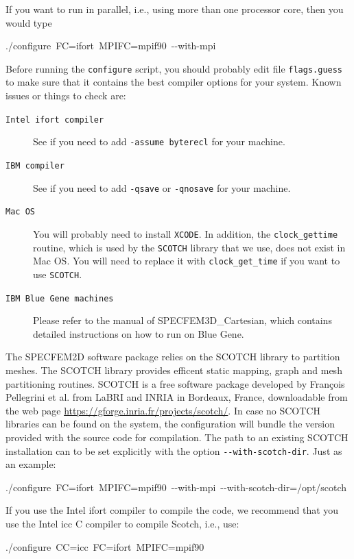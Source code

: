\documentclass[oneside,english,onecolumn,letterpaper]{book}
\newenvironment{lyxcode}
{\begin{list}{}{
\setlength{\rightmargin}{\leftmargin}
\setlength{\listparindent}{0pt}%
\raggedright
\setlength{\itemsep}{0pt}
\setlength{\parsep}{0pt}
\normalfont\ttfamily}%
 \item[]}
{\end{list}}
\begin{document}
If you want to run in parallel, i.e., using more than one processor core, then you would type
\begin{lyxcode}
./configure~FC=ifort~MPIFC=mpif90~-{}-with-mpi
\end{lyxcode}

Before running the \texttt{configure} script, you should probably edit file \texttt{flags.guess} to make sure that it contains the best compiler options for your system. Known issues or things to check are:

\begin{description}
\item [{\texttt{Intel ifort compiler}}] See if you need to add \texttt{-assume byterecl} for your machine.
\item [{\texttt{IBM compiler}}] See if you need to add \texttt{-qsave} or \texttt{-qnosave} for your machine.
\item [{\texttt{Mac OS}}] You will probably need to install \texttt{XCODE}.
In addition, the \texttt{clock\_gettime} routine, which is used by the \texttt{SCOTCH} library that we use, does not exist in Mac OS.
You will need to replace it with \texttt{clock\_get\_time} if you want to use \texttt{SCOTCH}.
\item [{\texttt{IBM Blue Gene machines}}] Please refer to the manual of SPECFEM3D\_Cartesian, which contains detailed instructions on how to run on Blue Gene.
\end{description}

The SPECFEM2D software package relies on the SCOTCH library to partition meshes.
The SCOTCH library \citep{PeRo96}
provides efficent static mapping, graph and mesh partitioning routines. SCOTCH is a free software package developed by
Fran\c {c}ois Pellegrini et al. from LaBRI and INRIA in Bordeaux, France, downloadable from the web page \url{https://gforge.inria.fr/projects/scotch/}.
In case no SCOTCH libraries can be found on the system, the configuration will bundle the version provided with the source code for compilation.
The path to an existing SCOTCH installation can to be set explicitly with the option \texttt{-{}-with-scotch-dir}.
Just as an example:
\begin{lyxcode}
./configure~FC=ifort~MPIFC=mpif90~-{}-with-mpi~-{}-with-scotch-dir=/opt/scotch
\end{lyxcode}

If you use the Intel ifort compiler to compile the code, we recommend that you use the Intel icc C compiler to compile Scotch, i.e., use:
\begin{lyxcode}
./configure~CC=icc~FC=ifort~MPIFC=mpif90
\end{lyxcode}
\end{document}
